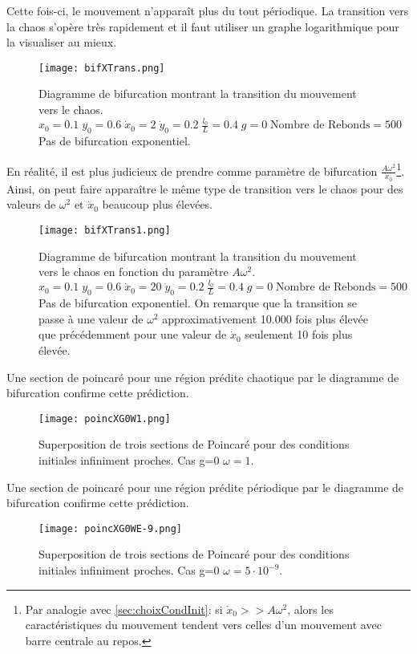\documentclass[a4paper]{report}
\begin{document}
Cette fois-ci, le mouvement n'apparaît plus du tout périodique. La transition vers la chaos s'opère très rapidement et il faut utiliser un graphe logarithmique pour la visualiser au mieux.
\begin{figure}[H]
   \texttt{[image: bifXTrans.png]}
      \caption[Transition du mouvement vers le chaos en fontion de \(A \omega ^2 \): g=0]{Diagramme de bifurcation montrant la transition du mouvement vers le chaos.\\ \(x_0=0.1 \; y_0=0.6 \; \dot{x}_0=2 \; \dot{y}_0=0.2 \; \frac{l_0}{L}=0.4 \; g=0 \; \text{Nombre de Rebonds}=500\) Pas de bifurcation exponentiel.}
\end{figure}

En réalité, il est plus judicieux de prendre comme paramètre de bifurcation \( \frac{A \omega ^2 }{\dot{x}_0}\)\footnote{Par analogie avec \ref{sec:choixCondInit}: si \(\dot{x}_0>>A \omega ^2\), alors les caractéristiques du mouvement tendent vers celles d'un mouvement avec barre centrale au repos.}. Ainsi, on peut faire apparaître le même type de transition vers le chaos pour des valeurs de \(\omega^2\) et \(\dot{x}_0\) beaucoup plus élevées.
\begin{figure}[H]
   \texttt{[image: bifXTrans1.png]}
      \caption[Transition du mouvement vers le chaos pour une vitesse de départ en x plus élevée]{Diagramme de bifurcation montrant la transition du mouvement vers le chaos en fonction du paramètre \( A \omega ^2 \).\\ \(x_0=0.1 \; y_0=0.6 \; \dot{x}_0=20 \; \dot{y}_0=0.2 \; \frac{l_0}{L}=0.4 \; g=0 \; \text{Nombre de Rebonds}=500\) Pas de bifurcation exponentiel. On remarque que la transition se passe à une valeur de \(\omega ^2\) approximativement 10.000 fois plus élevée que précédemment pour une valeur de \(\dot{x}_0\) seulement 10 fois plus élevée. }
\end{figure}

Une section de poincaré pour une région prédite chaotique par le diagramme de bifurcation confirme cette prédiction.
\begin{figure}[H]
   \texttt{[image: poincXG0W1.png]}
      \caption[Section de Poincaré chaotique: g=0 \(\omega=1\)]{Superposition de trois sections de Poincaré pour des conditions initiales infiniment proches. Cas g=0 \(\omega=1\).}
\end{figure}

Une section de poincaré pour une région prédite périodique par le diagramme de bifurcation confirme cette prédiction.
\begin{figure}[H]
   \texttt{[image: poincXG0WE-9.png]}
      \caption[Section de Poincaré périodique: g=0 \(\omega=5 \cdot 10^{-9}\)]{Superposition de trois sections de Poincaré pour des conditions initiales infiniment proches. Cas g=0 \(\omega=5 \cdot 10^{-9}\).}
\end{figure}
\end{document}
